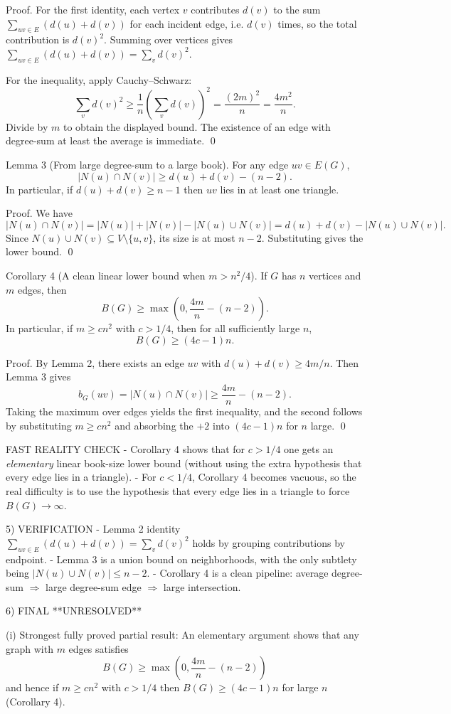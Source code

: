 Proof.
For the first identity, each vertex $v$ contributes $d(v)$ to the sum $\sum_{uv\in E}(d(u)+d(v))$ for each incident edge, i.e. $d(v)$ times, so the total contribution is $d(v)^2$.
Summing over vertices gives $\sum_{uv\in E}(d(u)+d(v))=\sum_v d(v)^2$.

For the inequality, apply Cauchy--Schwarz:
\[\sum_v d(v)^2 \ge \frac{1}{n}\left(\sum_v d(v)\right)^2=\frac{(2m)^2}{n}=\frac{4m^2}{n}.\]
Divide by $m$ to obtain the displayed bound. The existence of an edge with degree-sum at least the average is immediate. \qed

Lemma 3 (From large degree-sum to a large book).
For any edge $uv\in E(G)$,
\[|N(u)\cap N(v)| \ge d(u)+d(v)-(n-2).\]
In particular, if $d(u)+d(v)\ge n-1$ then $uv$ lies in at least one triangle.

Proof.
We have
\[|N(u)\cap N(v)| = |N(u)|+|N(v)|-|N(u)\cup N(v)|=d(u)+d(v)-|N(u)\cup N(v)|.\]
Since $N(u)\cup N(v)\subseteq V\setminus\{u,v\}$, its size is at most $n-2$.
Substituting gives the lower bound. \qed

Corollary 4 (A clean linear lower bound when $m>n^2/4$).
If $G$ has $n$ vertices and $m$ edges, then
\[B(G)\ge \max\!\left(0,\frac{4m}{n}-(n-2)\right).\]
In particular, if $m\ge c n^2$ with $c>1/4$, then for all sufficiently large $n$,
\[B(G)\ge (4c-1)n.\]

Proof.
By Lemma 2, there exists an edge $uv$ with $d(u)+d(v)\ge 4m/n$.
Then Lemma 3 gives
\[b_G(uv)=|N(u)\cap N(v)|\ge \frac{4m}{n}-(n-2).\]
Taking the maximum over edges yields the first inequality, and the second follows by substituting $m\ge c n^2$ and absorbing the $+2$ into $(4c-1)n$ for $n$ large. \qed

FAST REALITY CHECK
- Corollary 4 shows that for $c>1/4$ one gets an \emph{elementary} linear book-size lower bound (without using the extra hypothesis that every edge lies in a triangle).
- For $c<1/4$, Corollary 4 becomes vacuous, so the real difficulty is to use the hypothesis that every edge lies in a triangle to force $B(G)\to\infty$.

5) VERIFICATION
- Lemma 2 identity $\sum_{uv\in E}(d(u)+d(v))=\sum_v d(v)^2$ holds by grouping contributions by endpoint.
- Lemma 3 is a union bound on neighborhoods, with the only subtlety being $|N(u)\cup N(v)|\le n-2$.
- Corollary 4 is a clean pipeline: average degree-sum $\Rightarrow$ large degree-sum edge $\Rightarrow$ large intersection.

6) FINAL
**UNRESOLVED**

(i) Strongest fully proved partial result:
An elementary argument shows that any graph with $m$ edges satisfies
\[B(G)\ge \max\!\left(0,\frac{4m}{n}-(n-2)\right)\]
and hence if $m\ge c n^2$ with $c>1/4$ then $B(G)\ge (4c-1)n$ for large $n$ (Corollary 4).

